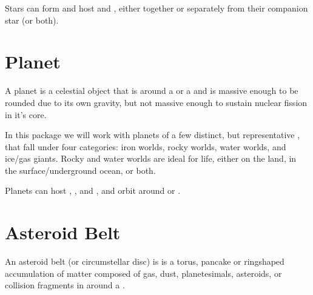\documentclass[letterpaper,10pt,english]{sphinxmanual}
\begin{document}
\sphinxAtStartPar
Stars can form {\hyperref[\detokenize{celestial_systems/binary_system:id1}]{}} and host {\hyperref[\detokenize{celestial_bodies/planet:id1}]{}}
and {\hyperref[\detokenize{celestial_bodies/asteroid_belt:id1}]{}}, either together or separately from their companion star (or both).


\section{Planet}
\label{\detokenize{celestial_bodies/planet:planet}}\label{\detokenize{celestial_bodies/planet::doc}}\label{\detokenize{celestial_bodies/planet:id1}}
\sphinxAtStartPar
A planet is a celestial object that is {\hyperref[\detokenize{quantities/orbital/orbital:id1}]{}}
around a {\hyperref[\detokenize{celestial_bodies/star:id1}]{}} or a {\hyperref[\detokenize{celestial_systems/binary_system:id1}]{}}
and is massive enough to be rounded due to its own gravity, but not massive
enough to sustain nuclear fission in it’s core.

\sphinxAtStartPar
In this package we will work with planets of a few distinct, but representative
{\hyperref[\detokenize{quantities/material/composition_type:id1}]{}}, that fall under four categories:
iron worlds, rocky worlds, water worlds, and ice/gas giants. Rocky and water
worlds are ideal for life, either on the land,
in the surface/underground ocean, or both.

\sphinxAtStartPar
Planets can host {\hyperref[\detokenize{celestial_bodies/satellite:id1}]{}}, {\hyperref[\detokenize{celestial_bodies/trojan:id1}]{}},
and {\hyperref[\detokenize{celestial_bodies/trojan_satellite:id1}]{}}, and orbit around {\hyperref[\detokenize{celestial_bodies/star:id1}]{}}
or {\hyperref[\detokenize{celestial_systems/binary_system:id1}]{}}.


\section{Asteroid Belt}
\label{\detokenize{celestial_bodies/asteroid_belt:asteroid-belt}}\label{\detokenize{celestial_bodies/asteroid_belt::doc}}\label{\detokenize{celestial_bodies/asteroid_belt:id1}}
\sphinxAtStartPar
An asteroid belt (or circumstellar disc) is is a torus,
pancake or ring\sphinxhyphen{}shaped accumulation of matter composed of
gas, dust, planetesimals, asteroids, or collision fragments in {\hyperref[\detokenize{quantities/orbital/orbital:id1}]{}} around a {\hyperref[\detokenize{celestial_bodies/star:id1}]{}}.
\end{document}
